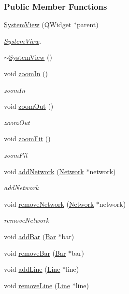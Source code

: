 \subsubsection*{Public Member Functions}
\begin{DoxyCompactItemize}
\item 
\hyperlink{group___graphics_ga660a455ff7b98cb92410b0bf1cbb2eeb}{System\+View} (Q\+Widget $\ast$parent)
\begin{DoxyCompactList}\small\item\em \hyperlink{class_system_view}{System\+View}. \end{DoxyCompactList}\item 
\hyperlink{group___graphics_ga0091352981c1efa5498819b69698db44}{$\sim$\+System\+View} ()
\item 
void \hyperlink{group___graphics_ga93170319ee5fbf9098353b383fc8a368}{zoom\+In} ()
\begin{DoxyCompactList}\small\item\em zoom\+In \end{DoxyCompactList}\item 
void \hyperlink{group___graphics_gaf971471c76265ec21cdde2aafe9b609f}{zoom\+Out} ()
\begin{DoxyCompactList}\small\item\em zoom\+Out \end{DoxyCompactList}\item 
void \hyperlink{group___graphics_gac1bf0b6a80216df74a8da1cb8ac5f0e8}{zoom\+Fit} ()
\begin{DoxyCompactList}\small\item\em zoom\+Fit \end{DoxyCompactList}\item 
void \hyperlink{group___graphics_gae183447d0777c7b2b940a977f9b64c3f}{add\+Network} (\hyperlink{class_network}{Network} $\ast$network)
\begin{DoxyCompactList}\small\item\em add\+Network \end{DoxyCompactList}\item 
void \hyperlink{group___graphics_ga2078ad08ff93b9a8683d567e3f9f714e}{remove\+Network} (\hyperlink{class_network}{Network} $\ast$network)
\begin{DoxyCompactList}\small\item\em remove\+Network \end{DoxyCompactList}\item 
void \hyperlink{group___graphics_gac4e02019d41c203c788ff1e6f3ee460e}{add\+Bar} (\hyperlink{class_bar}{Bar} $\ast$bar)
\item 
void \hyperlink{group___graphics_ga1e96b08395a2f1b961dedbb3e8c99a50}{remove\+Bar} (\hyperlink{class_bar}{Bar} $\ast$bar)
\item 
void \hyperlink{group___graphics_gaed2fb15d518cab9a52ea1ee258846bfc}{add\+Line} (\hyperlink{class_line}{Line} $\ast$line)
\item 
void \hyperlink{group___graphics_ga4af1d763d9b9c02933e62d1f6231ad18}{remove\+Line} (\hyperlink{class_line}{Line} $\ast$line)
\end{DoxyCompactItemize}
